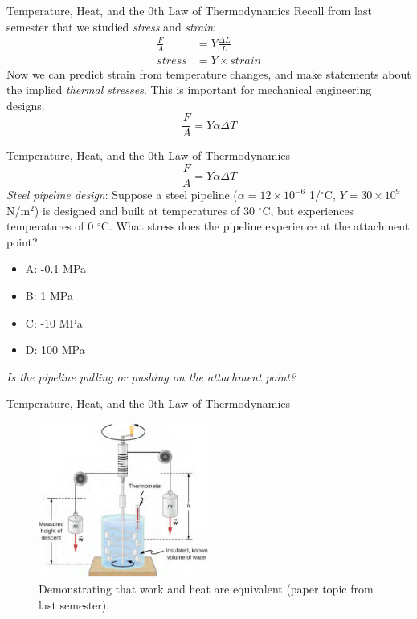 \documentclass{beamer}
\begin{document}
\begin{frame}{Temperature, Heat, and the 0th Law of Thermodynamics}
Recall from last semester that we studied \textit{stress} and \textit{strain}:
\begin{align}
\frac{F}{A} &= Y \frac{\Delta L}{L} \\
stress &= Y \times strain
\end{align}
Now we can predict strain from temperature changes, and make statements about the implied \textit{thermal stresses}.  This is important for mechanical engineering designs.
\begin{equation}
\frac{F}{A} = Y \alpha \Delta T
\end{equation}
\end{frame}

\begin{frame}{Temperature, Heat, and the 0th Law of Thermodynamics}
\begin{equation}
\frac{F}{A} = Y \alpha \Delta T
\end{equation}
\textit{Steel pipeline design}: Suppose a steel pipeline ($\alpha = 12 \times 10^{-6}$ 1/$^{\circ}$C, $Y = 30\times 10^{9}$ N/m$^2$) is designed and built at temperatures of 30 $^{\circ}$C, but experiences temperatures of 0 $^{\circ}$C.  What stress does the pipeline experience at the attachment point?
\begin{itemize}
\item A: -0.1 MPa
\item B: 1 MPa
\item C: -10 MPa
\item D: 100 MPa
\end{itemize}
\textit{Is the pipeline pulling or pushing on the attachment point?}
\end{frame}

\begin{frame}{Temperature, Heat, and the 0th Law of Thermodynamics}
\begin{figure}
\centering
\includegraphics[width=0.5\textwidth]{figures/Joule.png}
\caption{\label{fig:Joule} Demonstrating that work and heat are equivalent (paper topic from last semester).}
\end{figure}
\end{frame}
\end{document}
